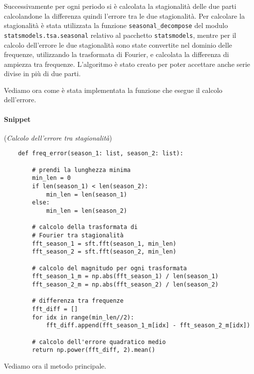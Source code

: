 Successivamente per ogni periodo si è calcolata la stagionalità delle due parti
calcolandone la differenza quindi l'errore tra le due stagionalità. Per calcolare la stagionalità
è stata utilizzata la funzione \texttt{seasonal\_decompose} del modulo \texttt{statsmodels.tsa.seasonal}
relativo al pacchetto \texttt{statsmodels}, mentre per il calcolo dell'errore
le due stagionalità sono state convertite nel dominio delle frequenze, utilizzando la trasformata
di Fourier, e calcolata la differenza di ampiezza tra frequenze. L'algoritmo è stato 
creato per poter accettare anche serie divise in più di due parti.

Vediamo ora come è stata implementata la funzione che esegue il calcolo dell'errore.

\paragraph*{Snippet} (\textit{Calcolo dell'errore tra stagionalità})
\begin{verbatim}
    def freq_error(season_1: list, season_2: list):

        # prendi la lunghezza minima 
        min_len = 0
        if len(season_1) < len(season_2):
            min_len = len(season_1)
        else:
            min_len = len(season_2)

        # calcolo della trasformata di 
        # Fourier tra stagionalità
        fft_season_1 = sft.fft(season_1, min_len)
        fft_season_2 = sft.fft(season_2, min_len)

        # calcolo del magnitudo per ogni trasformata
        fft_season_1_m = np.abs(fft_season_1) / len(season_1)
        fft_season_2_m = np.abs(fft_season_2) / len(season_2)

        # differenza tra frequenze
        fft_diff = []
        for idx in range(min_len//2):
            fft_diff.append(fft_season_1_m[idx] - fft_season_2_m[idx])
        
        # calcolo dell'errore quadratico medio
        return np.power(fft_diff, 2).mean() 
\end{verbatim}


Vediamo ora il metodo principale.
